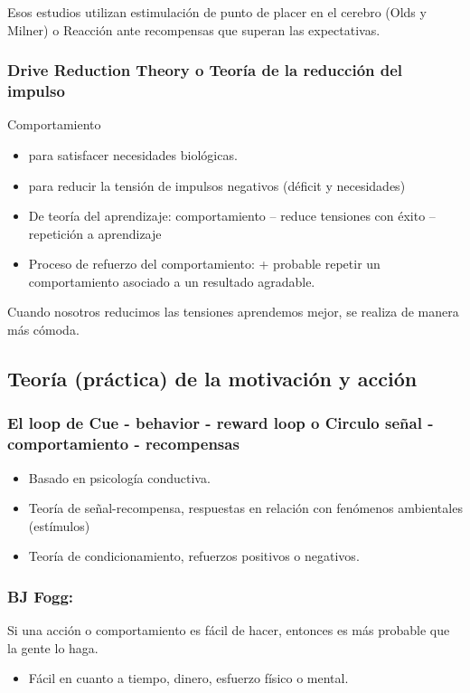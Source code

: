 \documentclass[12pt]{report} %
\begin{document}
Esos estudios utilizan estimulación de punto de placer en el cerebro (Olds y Milner) o Reacción ante recompensas que superan las expectativas.

\subsubsection{Drive Reduction Theory o Teoría de la reducción del impulso}
Comportamiento
\begin{itemize}
  \item para satisfacer necesidades biológicas.
  \item para reducir la tensión de impulsos negativos (déficit y necesidades)
  \item De teoría del aprendizaje: comportamiento – reduce tensiones con éxito – repetición a aprendizaje
  \item Proceso de refuerzo del comportamiento: + probable repetir un comportamiento asociado a un resultado agradable.
\end{itemize}
Cuando nosotros reducimos las tensiones aprendemos mejor, se realiza de manera más cómoda.

\subsection{Teoría (práctica) de la motivación y acción}
\subsubsection{El loop de Cue - behavior - reward loop o Circulo señal - comportamiento - recompensas}
\begin{itemize}
  \item Basado en psicología conductiva.
  \item Teoría de señal-recompensa, respuestas en relación con fenómenos ambientales (estímulos)
  \item Teoría de condicionamiento, refuerzos positivos o negativos.
\end{itemize} 

\subsubsection{BJ Fogg:}
Si una acción o comportamiento es fácil de hacer, entonces es más probable que la gente lo haga.
\begin{itemize}
  \item Fácil en cuanto a tiempo, dinero, esfuerzo físico o mental.
\end{itemize}
\end{document}
